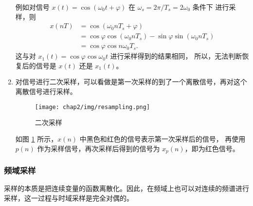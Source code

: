 \begin{definition}[欠采样]
\begin{enumerate}
            例如对信号 $x(t) = \cos(\omega_0 t + \varphi)$ 在 $\omega_s = 2\pi/T_s = 2\omega_0$ 条件下
            进行采样，则
            \begin{align*}
                x(nT) & = \cos(\omega_0 nT_s + \varphi) \\
                & = \cos\varphi\cos(\omega_0 nT_s) - \sin\varphi\sin(\omega_0 nT_s) \\
                & = \cos\varphi\cos n\omega_0 T_s.
            \end{align*}
            这与对 $x_1(t) = \cos\varphi\cos\omega_0 t$ 进行采样得到的结果相同，
            所以，无法判断恢复后的信号是 $x(t)$ 还是 $x_1(t)$。        
        \item 对信号进行二次采样，可以看做是第一次采样的到了一个离散信号，再对这个离散信号进行采样。
            \begin{figure}[H]
                \centering
                \texttt{[image: chap2/img/resampling.png]}
                \caption{二次采样}
                \label{fig:resampling.png}
            \end{figure}
            如图 \ref{fig:resampling.png} 所示，$x(n)$ 中黑色和红色的信号表示第一次采样后的信号，
            再使用 $p(n)$ 作为采样信号，再次采样后得到的信号为 $x_p(n)$，即为红色信号。
    \end{enumerate}
\end{definition}

\subsubsection{频域采样}

采样的本质是把连续变量的函数离散化。因此，在频域上也可以对连续的频谱进行采样，这一过程与时域采样是完全对偶的。

